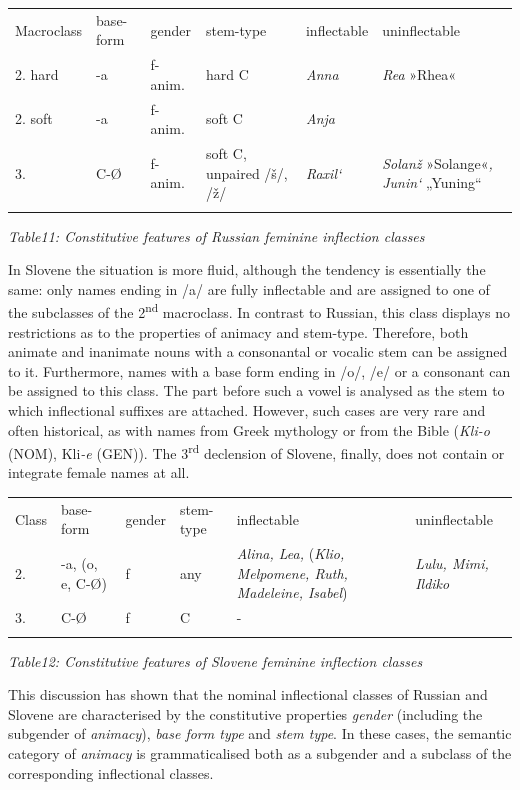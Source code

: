 \documentclass[output=paper]{langscibook}
\begin{document}
\begin{tabularx}{\textwidth}{XXXXXX}

\lsptoprule

Macroclass & base-form & gender & stem-type & inflectable & uninflectable\\
2. hard & {}-a & f-anim. & hard C & \textit{Anna} & \textit{Rea} »Rhea«\\
2. soft & {}-a & f-anim. & soft C & \textit{Anja} & \\
3. & C-Ø & f-anim. & soft C, unpaired /š/, /ž/ & \textit{Raxil‘} & \textit{Solanž} »Solange«\textit{, Junin‘} „Yuning“\\
\lspbottomrule
\end{tabularx}
\textit{Table11: Constitutive features of Russian feminine inflection classes}

In Slovene the situation is more fluid, although the tendency is essentially the same: only names ending in /a/ are fully inflectable and are assigned to one of the subclasses of the 2\textsuperscript{nd} macroclass. In contrast to Russian, this class displays no restrictions as to the properties of animacy and stem-type. Therefore, both animate and inanimate nouns with a consonantal or vocalic stem can be assigned to it. Furthermore, names with a base form ending in /o/, /e/ or a consonant can be assigned to this class.  The part before such a vowel is analysed as the stem to which inflectional suffixes are attached. However, such cases are very rare and often historical, as with names from Greek mythology or from the Bible (\textit{Kli-o} (NOM), Kli\textit{{}-e} (GEN)). The 3\textsuperscript{rd} declension of Slovene, finally, does not contain or integrate female names at all.


\begin{tabularx}{\textwidth}{XXXXXX}

\lsptoprule

Class & base-form & gender & stem-type & inflectable & uninflectable\\
2. & {}-a, (o, e, C-Ø) & f & any & \textit{Alina, Lea,} (\textit{Klio, Melpomene, Ruth, Madeleine, Isabel}) & \textit{Lulu, Mimi, Ildiko}\\
3. & C-Ø & f & C & {}- & \\
\lspbottomrule
\end{tabularx}
\textit{Table12: Constitutive features of Slovene feminine inflection classes}

This discussion has shown that the nominal inflectional classes of Russian and Slovene are characterised by the constitutive properties \textit{gender} (including the subgender of \textit{animacy}), \textit{base form type} and \textit{stem type}. In these cases, the semantic category of \textit{animacy} is grammaticalised both as a subgender and a subclass of the corresponding inflectional classes. 
\end{document}
